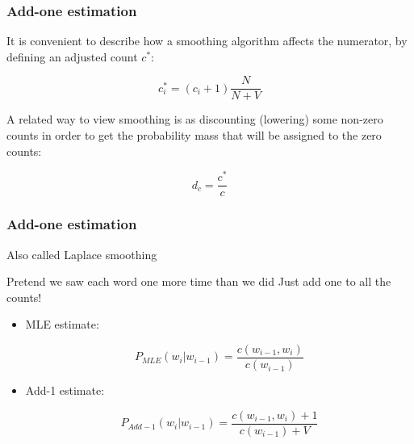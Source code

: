 \documentclass[13.5pt,aspecratio=169]{beamer}
\begin{document}

\begin{frame}
    \onehalfspacing
        \frametitle{Add-one estimation}
        
        {\Large It is convenient to describe how a smoothing algorithm affects the numerator, by defining an adjusted count $c^*$: 
        } \vspace{-2em}
        {\Large
        \begin{center} 
            \[ c^*_i = (c_i + 1) \frac{N}{N + V} \]
        \end{center}
        }

        \begin{block}{}
            A related way to view smoothing is as discounting (lowering) some non-zero counts in order to get the probability mass that will be assigned to the zero counts: 
        \end{block} \vspace{-2em}
        {\Large
        \begin{center} 
            \[ d_c = \frac{c^*}{c} \]
        \end{center}
        }
\end{frame}



\begin{frame}
\onehalfspacing
	\frametitle{Add-one estimation}
	
    {\Large Also called Laplace smoothing}
    \begin{block}{}
        Pretend we saw each word one more time than we did
Just add one to all the counts!
    \end{block}
    \begin{itemize}
        \item MLE estimate:  
        \vspace{-2em}
        \begin{center} 
            \[ P_{MLE}(w_i | w_{i-1}) = \frac{c(w_{i-1}, w_i)}{c(w_{i-1})} \]
          \end{center}
        \item Add-1 estimate:
        \vspace{-2em}
        \begin{center} 
            \[ P_{Add-1}(w_i | w_{i-1}) = \frac{c(w_{i-1}, w_i) + 1}{c(w_{i-1}) + V} \]
          \end{center}
    \end{itemize}
\end{frame}
\end{document}
